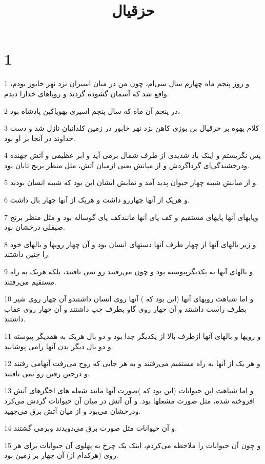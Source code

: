 

\title{حزقيال}


\chapter{1}

\par 1 و روز پنجم ماه چهارم سال سی‌ام، چون من در میان اسیران نزد نهر خابور بودم، واقع شد که آسمان گشوده گردید و رویاهای خدارا دیدم.
\par 2 در پنجم آن ماه که سال پنجم اسیری یهویاکین پادشاه بود،
\par 3 کلام یهوه بر حزقیال بن بوزی کاهن نزد نهر خابور در زمین کلدانیان نازل شد و دست خداوند در آنجا بر او بود.
\par 4 پس نگریستم و اینک باد شدیدی از طرف شمال برمی آید و ابر عظیمی و آتش جهنده ودرخشندگی‌ای گرداگردش و از میانش یعنی ازمیان آتش، مثل منظر برنج تابان بود.
\par 5 و از میانش شبیه چهار حیوان پدید آمد و نمایش ایشان این بود که شبیه انسان بودند.
\par 6 و هریک از آنها چهاررو داشت و هریک از آنها چهار بال داشت.
\par 7 وپایهای آنها پایهای مستقیم و کف پای آنها مانندکف پای گوساله بود و مثل منظر برنج صیقلی درخشان بود.
\par 8 و زیر بالهای آنها از چهار طرف آنها دستهای انسان بود و آن چهار رویها و بالهای خود را چنین داشتند.
\par 9 و بالهای آنها به یکدیگرپیوسته بود و چون می‌رفتند رو نمی تافتند، بلکه هریک به راه مستقیم می‌رفتند.
\par 10 و اما شباهت رویهای آنها (این بود که ) آنها روی انسان داشتندو آن چهار روی شیر بطرف راست داشتند و آن چهار روی گاو بطرف چپ داشتند و آن چهار روی عقاب داشتند.
\par 11 و رویها و بالهای آنها ازطرف بالا از یکدیگر جدا بود و دو بال هریک به همدیگر پیوسته و دو بال دیگر بدن آنها رامی پوشانید.
\par 12 و هر یک از آنها به راه مستقیم می‌رفتند و به هر جایی که روح می‌رفت آنهامی رفتند و درحین رفتن رو نمی تافتند.
\par 13 و اما شباهت این حیوانات (این بود که )صورت آنها مانند شعله های اخگرهای آتش افروخته شده، مثل صورت مشعلها بود. و آن آتش در میان آن حیوانات گردش می‌کرد ودرخشان می‌بود و از میان آتش برق می‌جهید.
\par 14 و آن حیوانات مثل صورت برق می‌دویدند وبرمی گشتند.
\par 15 و چون آن حیوانات را ملاحظه می‌کردم، اینک یک چرخ به پهلوی آن حیوانات برای هر روی (هرکدام از) آن چهار بر زمین بود.
